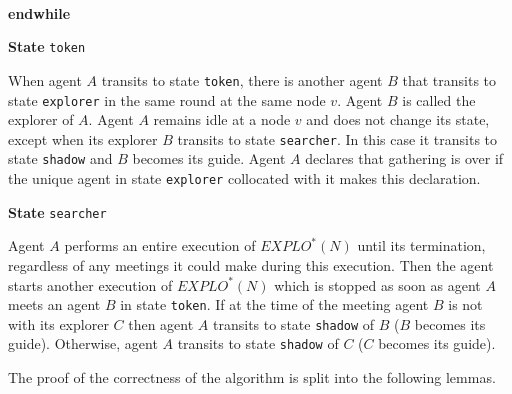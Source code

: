\documentclass[11pt]{article}
\begin{document}
     \noindent
       \hspace*{0.5cm}{agent $A$ waits $2 \cdot  T(EXPLO(N))$ rounds: this waiting period is interrupted} \\
       \hspace*{0.5cm}{if $A$ is visited by another agent;} 
       
        \vspace*{0.2cm}
        \noindent
\vspace*{0.2cm}
 {{\bf endwhile}}     
 


 
 
 
 
  \vspace*{0.2cm}
 
  \noindent
{\bf State} {\tt token}
 
  When agent $A$ transits to state {\tt token}, there is another agent $B$ that transits to state  {\tt explorer} in the same round at the same node $v$.
 Agent $B$ is called the explorer of $A$. 
Agent $A$ remains  idle at a node $v$ and does not change its state, except when its explorer $B$ transits to state {\tt searcher}. In this case it transits
 to state {\tt shadow} and $B$ becomes its guide. 
    Agent $A$ declares that gathering is over if the unique agent in state {\tt explorer} collocated with it makes this declaration.
    
     \vspace*{0.2cm}
 
  \noindent
  {\bf State} {\tt searcher}
    
{Agent $A$ performs an entire execution of $EXPLO^*(N)$ until its termination, regardless of any meetings it could make during this execution. Then the agent starts another execution of $EXPLO^*(N)$ which is stopped as soon as agent $A$ meets an agent $B$ in state {\tt token}.}
{If at the time of the meeting agent $B$ is not with its explorer $C$ then agent $A$ transits to state {\tt shadow} of $B$ ($B$ becomes its guide). Otherwise, agent $A$ transits to state {\tt shadow} of $C$ ($C$ becomes its guide).}

\vspace*{0.5cm}
The proof of the correctness of the algorithm is split into the following lemmas.
\end{document}
